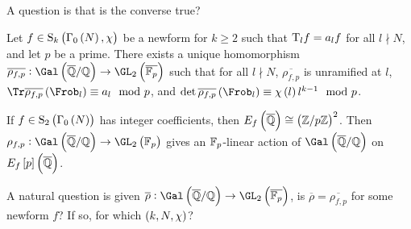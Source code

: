 \pagebreak

A question is that is the converse true?


\begin{theorem}
Let $ f \in \S_k\br{\Gamma_0\br{N}, \chi} $ be a newform for $ k \ge 2 $ such that $ \mathrm{T}_lf = a_lf $ for all $ l \nmid N $, and let $ p $ be a prime. There exists a unique homomorphism $ \overline{\rho_{f, p}} : \Gal\br{\overline{\QQ} / \QQ} \to \GL_2\br{\overline{\FF_p}} $ such that for all $ l \nmid N $, $ \overline{\rho_{f, p}} $ is unramified at $ l $, $ \Tr \overline{\rho_{f, p}}\br{\Frob_l} \equiv a_l \mod p $, and $ \det \overline{\rho_{f, p}}\br{\Frob_l} \equiv \chi\br{l}l^{k - 1} \mod p $.
\end{theorem}

\begin{example*}
If $ f \in \S_2\br{\Gamma_0\br{N}} $ has integer coefficients, then $ E_f\br{\overline{\QQ}} \cong \br{\ZZ / p\ZZ}^2 $. Then $ \rho_{f, p} : \Gal\br{\overline{\QQ} / \QQ} \to \GL_2\br{\FF_p} $ gives an $ \mathbb{F}_p $-linear action of $ \Gal\br{\overline{\QQ} / \QQ} $ on $ E_f\sbr{p}\br{\overline{\QQ}} $.
\end{example*}

A natural question is given $ \overline{\rho} : \Gal\br{\overline{\QQ} / \QQ} \to \GL_2\br{\overline{\FF_p}} $, is $ \overline{\rho} = \overline{\rho_{f, p}} $ for some newform $ f $? If so, for which $ \br{k, N, \chi} $?

